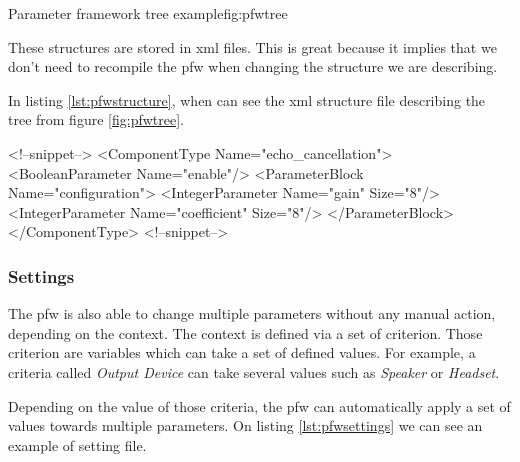 \begin{figureGraphics}{Parameter framework tree example}{fig:pfwtree}
\end{figureGraphics}

These structures are stored in \gls{xml} files. This is great because it implies that we don't need
to recompile the \gls{pfw} when changing the structure we are describing.

In listing \ref{lst:pfwstructure}, when can see the \gls{xml} structure file
describing the tree from figure \ref{fig:pfwtree}.

\begin{code}[language=pfwXml, caption=Structure file example snippet, label=lst:pfwstructure]
<!--snippet-->
<ComponentType Name="echo_cancellation">
    <BooleanParameter Name="enable"/>
    <ParameterBlock Name="configuration">
        <IntegerParameter Name="gain" Size="8"/>
        <IntegerParameter Name="coefficient" Size="8"/>
    </ParameterBlock>
</ComponentType>
<!--snippet-->
\end{code}

\subsubsection{Settings}
The \gls{pfw} is also able to change multiple parameters without any manual action, depending on the context.
The context is defined via a set of criterion. Those criterion are variables which can take a set of defined values.
For example, a criteria called \emph{Output Device} can take several values such as \emph{Speaker} or \emph{Headset}.

Depending on the value of those criteria, the \gls{pfw} can automatically apply a set of values towards
multiple parameters.
On listing \ref{lst:pfwsettings} we can see an example of setting file.

